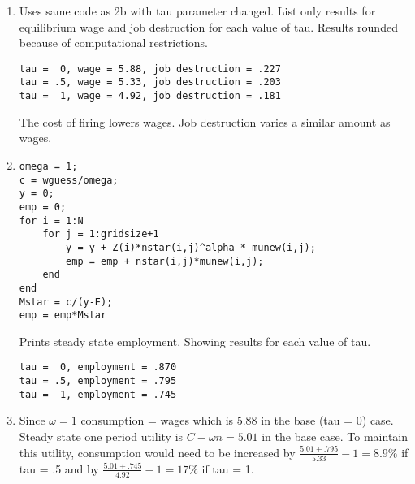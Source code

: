 \documentclass[12pt]{article}
\begin{document}
\begin{onehalfspace}
\begin{enumerate}[1.]
    
    \item Uses same code as 2b with tau parameter changed. List only results for equilibrium wage and job destruction for each value of tau. Results rounded because of computational restrictions.
\begin{lstlisting}
tau =  0, wage = 5.88, job destruction = .227
tau = .5, wage = 5.33, job destruction = .203
tau =  1, wage = 4.92, job destruction = .181
\end{lstlisting}
The cost of firing lowers wages. Job destruction varies a similar amount as wages.
    \item
\begin{lstlisting}
omega = 1;
c = wguess/omega;
y = 0;
emp = 0;
for i = 1:N
    for j = 1:gridsize+1
        y = y + Z(i)*nstar(i,j)^alpha * munew(i,j);
        emp = emp + nstar(i,j)*munew(i,j);
    end
end
Mstar = c/(y-E);
emp = emp*Mstar
\end{lstlisting}
Prints steady state employment. Showing results for each value of tau.
\begin{lstlisting}
tau =  0, employment = .870
tau = .5, employment = .795
tau =  1, employment = .745
\end{lstlisting}
    \item
    Since $\omega=1$ consumption = wages which is 5.88 in the base (tau = 0) case. Steady state one period utility is $C - \omega n = 5.01$ in the base case. To maintain this utility, consumption would need to be increased by $\frac{5.01+.795}{5.33}-1 = 8.9\%$ if tau = .5 and by $\frac{5.01+.745}{4.92}-1 = 17\%$ if tau = 1.
\end{enumerate}

\end{onehalfspace}
\end{document}
